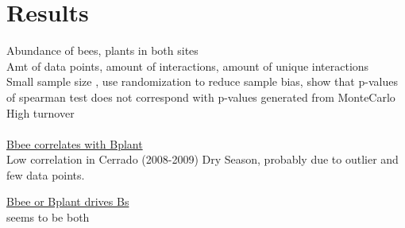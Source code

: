\documentclass[11pt]{article}
\begin{document}
\section{Results} %
Abundance of bees, plants in both sites \\
Amt of data points, amount of interactions, amount of unique interactions \\
Small sample size , use randomization to reduce sample bias, show that p-values of spearman test does not correspond with p-values generated from MonteCarlo \\
High turnover\\
\\
\underline{Bbee correlates with Bplant} \\
Low correlation in Cerrado (2008-2009) Dry Season, probably due to outlier and few data points.\\

\begin{figure}[H]
  \label{fig:plant-bee}
\end{figure}

\newpage
\underline{Bbee or Bplant drives Bs} \\
seems to be both \\
\end{document}
